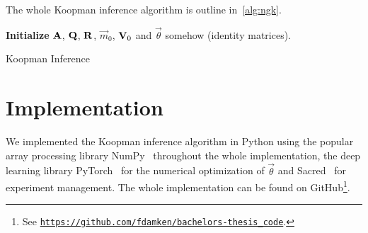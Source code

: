 	The whole Koopman inference algorithm is outline in~\autoref{alg:ngk}.

	\begin{algorithm}  \DontPrintSemicolon
		\textbf{Initialize} \(\boldsymbol{\mathrm{A}}\), \(\boldsymbol{\mathrm{Q}}\), \(\boldsymbol{\mathrm{R}}\), \(\vec{m}_0\), \(\boldsymbol{\mathrm{V}}_0\) and \(\vec{\theta}\) somehow (\eg identity matrices). \;
		\caption{Koopman Inference}
		\label{alg:ngk}
	\end{algorithm}

\section{Implementation}
	\label{sec:implementation}

	We implemented the Koopman inference algorithm in Python using the popular array processing library NumPy~\cite{harrisArrayProgrammingNumPy2020} throughout the whole implementation, the deep learning library PyTorch~\cite{paszkePyTorchImperativeStyle2019} for the numerical optimization of \(\vec{\theta}\) and Sacred~\cite{greffSacredInfrastructureComputational2017} for experiment management. The whole implementation can be found on GitHub\footnote{See \href{https://github.com/fdamken/bachelors-thesis_code}{\texttt{https://github.com/fdamken/bachelors-thesis\_code}}.}.

